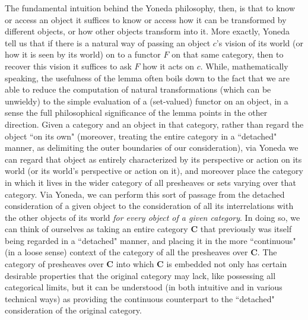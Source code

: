 \documentclass[a4paper]{book}
\theoremstyle{definition}
\theoremstyle{definition}
\theoremstyle{definition}
\theoremstyle{theorem}
\theoremstyle{definition}
\begin{document}
  The fundamental intuition behind the Yoneda philosophy, then, is that to know or access an object it suffices to know or access how it can be transformed by different objects, or how other objects transform into it. More exactly, Yoneda tell us that if there is a natural way of passing an object $c$'s vision of its world (or how it is seen by its world) on to a functor $F$ on that same category, then to recover this vision it suffices to ask $F$ how it acts on $c$. While, mathematically speaking, the usefulness of the lemma often boils down to the fact that we are able to reduce the computation of natural transformations (which can be unwieldy) to the simple evaluation of a (set-valued) functor on an object, in a sense the full philosophical significance of the lemma points in the other direction. Given a category and an object in that category, rather than regard the object ``on its own" (moreover, treating the entire category in a ``detached" manner, as delimiting the outer boundaries of our consideration), via Yoneda we can regard that object as entirely characterized by its perspective or action on its world (or its world's perspective or action on it), and moreover place the category in which it lives in the wider category of all presheaves or sets varying over that category. Via Yoneda, we can perform this sort of passage from the detached consideration of a given object to the consideration of all its interrelations with the other objects of its world \textit{for every object of a given category}. In doing so, we can think of ourselves as taking an entire category $\textbf{C}$ that previously was itself being regarded in a ``detached" manner, and placing it in the more ``continuous" (in a loose sense) context of the category of all the presheaves over $\textbf{C}$. The category of presheaves over $\textbf{C}$ into which \textbf{C} is embedded not only has certain desirable properties that the original category may lack, like possessing all categorical limits, but it can be understood (in both intuitive and in various technical ways) as providing the continuous counterpart to the  ``detached" consideration of the original category.
\end{document}
